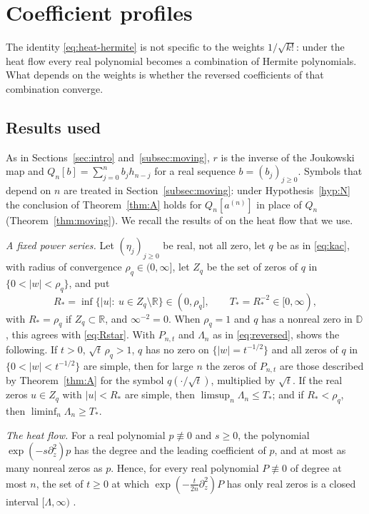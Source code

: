 \documentclass[11pt]{amsart}
\theoremstyle{definition}
\theoremstyle{remark}
\numberwithin{equation}{section}
\newcommand{\R}{\mathbb{R}}
\newcommand{\D}{\mathbb{D}}
\begin{document}
\section{Coefficient profiles}\label{sec:profiles}\label{subsec:profiles}

The identity \eqref{eq:heat-hermite} is not specific to the weights $1/\sqrt{k!}$: under the heat flow every real polynomial becomes a combination of Hermite polynomials. What depends on the weights is whether the reversed coefficients of that combination converge.

\subsection{Results used}\label{subsec:used}
As in Sections~\ref{sec:intro} and~\ref{subsec:moving}, $r$ is the inverse of the Joukowski map and $Q_n[b]=\sum_{j=0}^{n}b_jh_{n-j}$ for a real sequence $b=(b_j)_{j\ge0}$. Symbols that depend on $n$ are treated in Section~\ref{subsec:moving}: under Hypothesis~\ref{hyp:N} the conclusion of Theorem~\ref{thm:A} holds for $Q_n[a^{(n)}]$ in place of $Q_n$ (Theorem~\ref{thm:moving}). We recall the results of \cite{Main} on the heat flow that we use.

\emph{A fixed power series.} Let $(\eta_j)_{j\ge0}$ be real, not all zero, let $q$ be as in \eqref{eq:kac}, with radius of convergence $\rho_q\in(0,\infty]$, let $Z_q$ be the set of zeros of $q$ in $\{0<|w|<\rho_q\}$, and put
\begin{equation}\label{eq:Rstar-det}
R_*=\inf\{|u|:\ u\in Z_q\setminus\R\}\in(0,\rho_q],\qquad T_*=R_*^{-2}\in[0,\infty),
\end{equation}
with $R_*=\rho_q$ if $Z_q\subset\R$, and $\infty^{-2}=0$. When $\rho_q=1$ and $q$ has a nonreal zero in $\D$, this agrees with \eqref{eq:Rstar}. With $P_{n,t}$ and $\Lambda_n$ as in \eqref{eq:reversed}, \cite[Theorem~\ref{M-thm:fixedq}]{Main} shows the following. If $t>0$, $\sqrt t\,\rho_q>1$, $q$ has no zero on $\{|w|=t^{-1/2}\}$ and all zeros of $q$ in $\{0<|w|<t^{-1/2}\}$ are simple, then for large $n$ the zeros of $P_{n,t}$ are those described by Theorem~\ref{thm:A} for the symbol $q(\cdot/\sqrt t)$, multiplied by $\sqrt t$. If the real zeros $u\in Z_q$ with $|u|<R_*$ are simple, then $\limsup_n\Lambda_n\le T_*$; and if $R_*<\rho_q$, then $\liminf_n\Lambda_n\ge T_*$.

\emph{The heat flow.} For a real polynomial $p\not\equiv0$ and $s\ge0$, the polynomial $\exp(-s\partial_z^2)p$ has the degree and the leading coefficient of $p$, and at most as many nonreal zeros as $p$. Hence, for every real polynomial $P\not\equiv0$ of degree at most $n$, the set of $t\ge0$ at which $\exp(-\frac t{2n}\partial_z^2)P$ has only real zeros is a closed interval $[\Lambda,\infty)$ \cite[Lemma~\ref{M-lem:heat}(b),(c)]{Main}.
\end{document}
